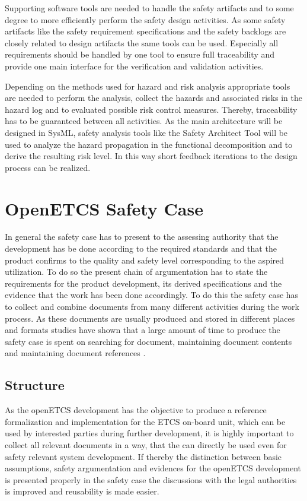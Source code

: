 \documentclass{template/openetcs_report}
\begin{document}
Supporting software tools are needed to handle the safety artifacts and to some degree to more efficiently perform the safety design activities. As some safety artifacts like the safety requirement specifications and the safety backlogs are closely related to design artifacts the same tools can be used. Especially all requirements should be handled by one tool to ensure full traceability and provide one main interface for the verification and validation activities.

Depending on the methods used for hazard and risk analysis appropriate tools are needed to perform the analysis, collect the hazards and associated risks in the hazard log and to evaluated possible risk control measures. Thereby, traceability has to be guaranteed between all activities. As the main architecture will be designed in SysML, safety analysis tools like the Safety Architect Tool will be used to analyze the hazard propagation in the functional decomposition and to derive the resulting risk level. In this way short feedback iterations to the design process can be realized.

\chapter{OpenETCS Safety Case}
\label{sec:safetycase}

In general the safety case has to present to the assessing authority that the development has be done according to the required standards and that the product confirms to the quality and safety level corresponding to the aspired utilization. 
To do so the present chain of argumentation has to state the requirements for the product development, its derived specifications and the evidence that the work has been done accordingly. To do this the safety case has to collect and combine documents from many different activities during the work process. As these documents are usually produced and stored in different places and formats studies have shown that a large amount of time to produce the safety case is spent on searching for document, maintaining document contents and maintaining document references \cite{Muller.2010}. 

\section{Structure}

As the openETCS development has the objective to produce a reference formalization and implementation for the ETCS on-board unit, which can be used by interested parties during further development, it is highly important to collect all relevant documents in a way, that the can directly be used even for safety relevant system development. If thereby the distinction between basic assumptions, safety argumentation and evidences for the openETCS development is presented properly in the safety case the discussions with the legal authorities is improved and reusability is made easier. 
\end{document}
